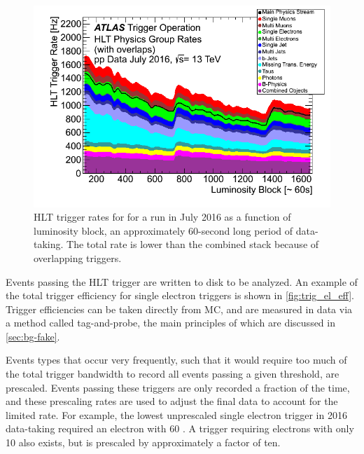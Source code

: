\begin{centering}
\begin{figure}[!hbt]
\myfloatalign
\includegraphics[width=.90\linewidth]{figures/atlas/Time_HLTGroupRate_Stack_2016_07.png}
\caption{\ac{HLT} trigger rates for for a run in July 2016 as a function of luminosity block, an approximately 60-second long period of data-taking. The total rate is lower than the combined stack because of overlapping triggers.}
\label{fig:hlt_rates}
\end{figure}
\end{centering}


Events passing the \ac{HLT} trigger are written to disk to be analyzed. An example of the total trigger efficiency for single electron triggers is shown in \autoref{fig:trig_el_eff}. Trigger efficiencies can be taken directly from \ac{MC}, and are measured in data via a method called tag-and-probe, the main principles of which are discussed in \autoref{sec:bg-fake}.


Events types that occur very frequently, such that it would require too much of the total trigger bandwidth to record all events passing a given threshold, are prescaled. Events passing these triggers are only recorded a fraction of the time, and these prescaling rates are used to adjust the final data to account for the limited rate. For example, the lowest unprescaled single electron trigger in 2016 data-taking required an electron with 60 \gev \pt. A trigger requiring electrons with only 10 \gev \pt also exists, but is prescaled by approximately a factor of ten. 


